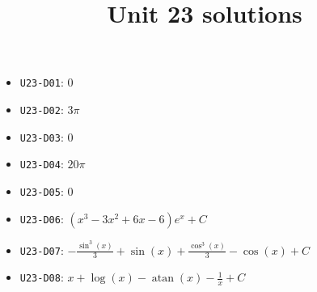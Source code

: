 \title{Unit 23 solutions}\maketitle\begin{itemize}
  \item \texttt{U23-D01}: $0$
  \item \texttt{U23-D02}: $3 \pi$
  \item \texttt{U23-D03}: $0$
  \item \texttt{U23-D04}: $20 \pi$
  \item \texttt{U23-D05}: $0$
  \item \texttt{U23-D06}: $\left(x^{3} - 3 x^{2} + 6 x - 6\right) e^{x}+C$
  \item \texttt{U23-D07}: $- \frac{\sin^{3}{\left(x \right)}}{3} + \sin{\left(x \right)} + \frac{\cos^{3}{\left(x \right)}}{3} - \cos{\left(x \right)}+C$
  \item \texttt{U23-D08}: $x + \log{\left(x \right)} - \operatorname{atan}{\left(x \right)} - \frac{1}{x}+C$
\end{itemize}
